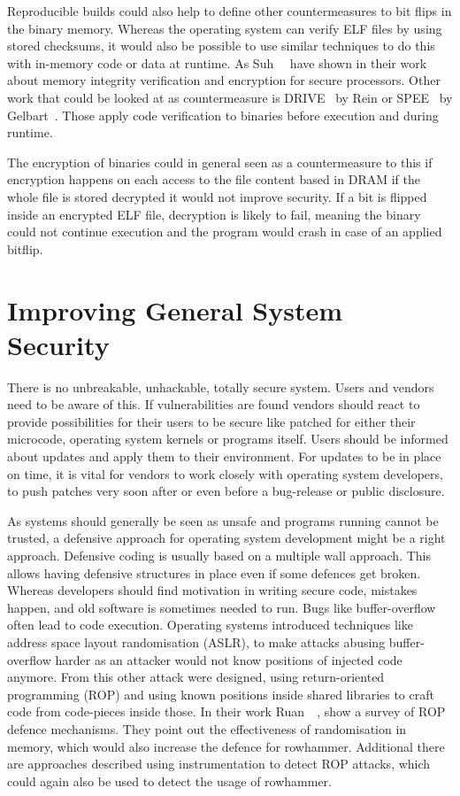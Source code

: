 Reproducible builds could also help to define other countermeasures to bit flips
in the binary memory. Whereas the operating system can verify ELF files by using
stored checksums, it would also be possible to use similar techniques to do this
with in-memory code or data at runtime. As Suh~\etal~\cite{memintegrity} have
shown in their work about memory integrity verification and encryption for
secure processors. Other work that could be looked at as countermeasure is
DRIVE~\cite{drive} by Rein or SPEE~\cite{spee} by Gelbart~\etal. Those apply
code verification to binaries before execution and during runtime.

The encryption of binaries could in general seen as a countermeasure to this if
encryption happens on each access to the file content based in DRAM if the whole
file is stored decrypted it would not improve security. If a bit is flipped
inside an encrypted ELF file, decryption is likely to fail, meaning the binary
could not continue execution and the program would crash in case of an applied
bitflip.

\section{Improving General System Security}

There is no unbreakable, unhackable, totally secure system. Users and vendors
need to be aware of this. If vulnerabilities are found vendors should react to
provide possibilities for their users to be secure like patched for either their
microcode, operating system kernels or programs itself. Users should be informed
about updates and apply them to their environment. For updates to be in place on
time, it is vital for vendors to work closely with operating system developers,
to push patches very soon after or even before a bug-release or public
disclosure.

As systems should generally be seen as unsafe and programs running cannot be
trusted, a defensive approach for operating system development might be a right
approach. Defensive coding is usually based on a multiple wall approach. This
allows having defensive structures in place even if some defences get broken.
Whereas developers should find motivation in writing secure code, mistakes
happen, and old software is sometimes needed to run. Bugs like buffer-overflow
often lead to code execution. Operating systems introduced techniques like
address space layout randomisation (ASLR), to make attacks abusing
buffer-overflow harder as an attacker would not know positions of injected code
anymore. From this other attack were designed, using return-oriented programming
(ROP) and using known positions inside shared libraries to craft code from
code-pieces inside those. In their work Ruan~\etal~\cite{ropsur}, show a survey
of ROP defence mechanisms. They point out the effectiveness of randomisation in
memory, which would also increase the defence for rowhammer. Additional there
are approaches described using instrumentation to detect ROP attacks, which
could again also be used to detect the usage of rowhammer.

